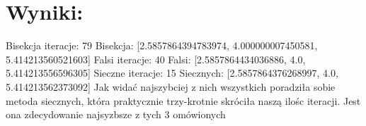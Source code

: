 \documentclass[12pt]{article}
\begin{document}
\section{Wyniki:}
Bisekcja iteracje:  79\newline
Bisekcja: [2.5857864394783974, 4.000000007450581, 5.414213560521603]\newline
Falsi iteracje:  40\newline
Falsi:  [2.5857864434036886, 4.0, 5.414213556596305]\newline
Sieczne iteracje:  15\newline
Siecznych:  [2.5857864376268997, 4.0, 5.414213562373092]\newline
Jak widać najszybciej z nich wszystkich poradziła sobie metoda siecznych, która praktycznie trzy-krotnie skróciła naszą ilośc iteracji. Jest ona zdecydowanie najsyzbsze z tych 3 omówionych
\end{document}
